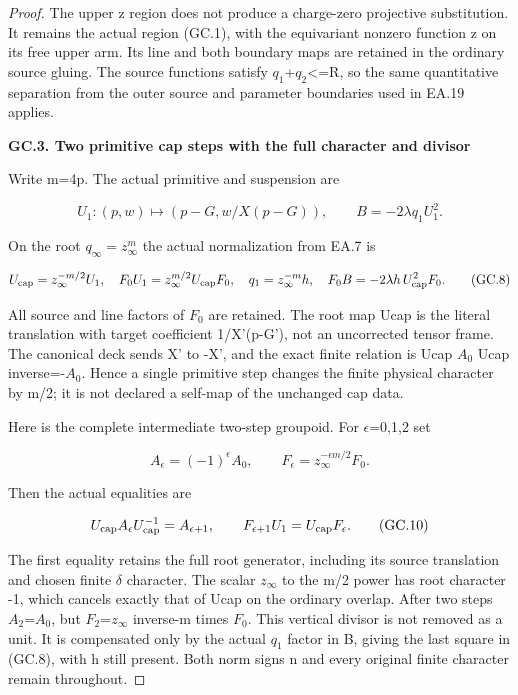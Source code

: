 \begin{proof}
The upper z region does not produce a charge-zero projective
substitution. It remains the actual region (GC.1), with the
equivariant nonzero function z on its free upper arm. Its line
and both boundary maps are retained in the ordinary source
gluing. The source functions satisfy
\textbar{}\(q_1\)\textbar+\textbar{}\(q_2\)\textbar\textless=R, so the same quantitative separation from the
outer source and parameter boundaries used in EA.19 applies.

\par

\medskip\noindent\textbf{GC.3. Two primitive cap steps with the full character and divisor}

\par\nobreak

Write m=4p. The actual primitive and suspension are

\[
 U_1:(p,w)\longmapsto(p-G,w/X(p-G)),\qquad
 B=-2\lambda q_1 U_1^2.                            \tag{GC.7}
\]

On the root \(q_\infty=z_\infty^m\) the actual normalization from
EA.7 is

\[
 U_{\rm cap}=z_\infty^{-m/2}U_1,\quad
 F_0U_1=z_\infty^{m/2}U_{\rm cap}F_0,\quad
 q_1=z_\infty^{-m}h,\quad
 F_0B=-2\lambda h\,U_{\rm cap}^2F_0.              \tag{GC.8}
\]

All source and line factors of \(F_0\) are retained. The root map
Ucap is the literal translation with target coefficient
1/X'(p-G'), not an uncorrected tensor frame. The canonical
deck sends X' to -X', and the exact finite relation is
Ucap \(A_0\) Ucap inverse=-\(A_0\). Hence a single primitive step changes
the finite physical character by m/2; it is not declared a
self-map of the unchanged cap data.

Here is the complete intermediate two-step groupoid. For
\(\epsilon\)=0,1,2 set

\[
 A_\epsilon=(-1)^\epsilon A_0,\qquad
 F_\epsilon=z_\infty^{-\epsilon m/2}F_0.
 \tag{GC.9}
\]

Then the actual equalities are

\[
 U_{\rm cap} A_\epsilon U_{\rm cap}^{-1}
       =A_{\epsilon+1},\qquad
 F_{\epsilon+1}U_1=U_{\rm cap}F_\epsilon.
 \tag{GC.10}
\]

The first equality retains the full root generator, including
its source translation and chosen finite \(\delta\) character.
The scalar \(z_{\infty}\) to the m/2 power has root character -1,
which cancels exactly that of Ucap on the ordinary overlap.
After two steps \(A_2\)=\(A_0\), but \(F_2\)=\(z_{\infty}\) inverse-m times \(F_0\).
This vertical divisor is not removed as a unit. It is
compensated only by the actual \(q_1\) factor in B, giving the last
square in (GC.8), with h still present. Both norm signs n and
every original finite character remain throughout.


\end{proof}
